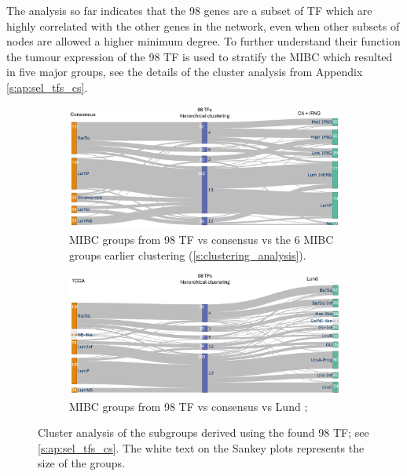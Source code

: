 The analysis so far indicates that the 98 genes are a subset of TF which are highly correlated with the other genes in the network, even when other subsets of nodes are allowed a higher minimum degree. To further understand their function the tumour expression of the 98 TF is used to stratify the MIBC which resulted in five major groups, see the details of the cluster analysis from Appendix \cref{s:ap:sel_tfs_cs}.

\begin{figure}[!htb]
    \centering
    \begin{subfigure}[!t]{1.0\textwidth}
        \includegraphics[width=1.0\textwidth,keepaspectratio]{Sections/Network_I/Resources/selective_pruning/sel_tfs/sankey_sel_tfs_VU_CS.png}
        \caption{MIBC groups from 98 TF vs consensus \citep{Kamoun2020-tj} vs the 6 MIBC groups earlier clustering (\ref{s:clustering_analysis}).}
        \label{fig:N_I:sankey_sel_tfs_vuCs}
    \end{subfigure}
    \begin{subfigure}[!t]{1.0\textwidth}
        \includegraphics[width=1.0\textwidth,keepaspectratio]{Sections/Network_I/Resources/selective_pruning/sel_tfs/sankey_sel_tfs.png}
        \caption{MIBC groups from 98 TF vs consensus \citep{Kamoun2020-tj} vs Lund \citep{Marzouka2018-ge};}
        \label{fig:N_I:sankey_sel_tfs}
    \end{subfigure}
    \caption[MIBC found from the 98 TF]{Cluster analysis of the subgroups derived using the found 98 TF; see \cref{s:ap:sel_tfs_cs}. The white text on the Sankey plots represents the size of the groups. }
    \label{fig:N_I:sel_tfs_cs_analysis}
\end{figure}



